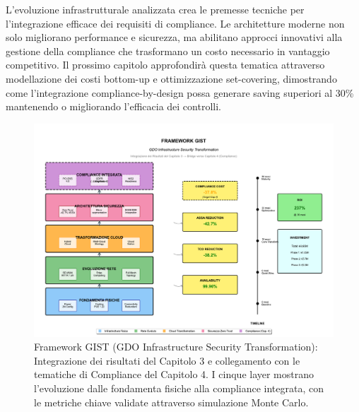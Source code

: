 L'evoluzione infrastrutturale analizzata crea le premesse tecniche per l'integrazione efficace dei requisiti di compliance. Le architetture moderne non solo migliorano performance e sicurezza, ma abilitano approcci innovativi alla gestione della compliance che trasformano un costo necessario in vantaggio competitivo. Il prossimo capitolo approfondirà questa tematica attraverso modellazione dei costi bottom-up e ottimizzazione set-covering, dimostrando come l'integrazione compliance-by-design possa generare saving superiori al 30\% mantenendo o migliorando l'efficacia dei controlli.
\begin{figure}[htbp]
\centering
\includegraphics[width=\textwidth]{thesis_figures/cap3/figura_3_6_framework_integrato.pdf}
\caption{Framework GIST (GDO Infrastructure Security Transformation): 
         Integrazione dei risultati del Capitolo 3 e collegamento con 
         le tematiche di Compliance del Capitolo 4. I cinque layer mostrano 
         l'evoluzione dalle fondamenta fisiche alla compliance integrata, 
         con le metriche chiave validate attraverso simulazione Monte Carlo.}
\label{fig:framework_gist}
\end{figure}